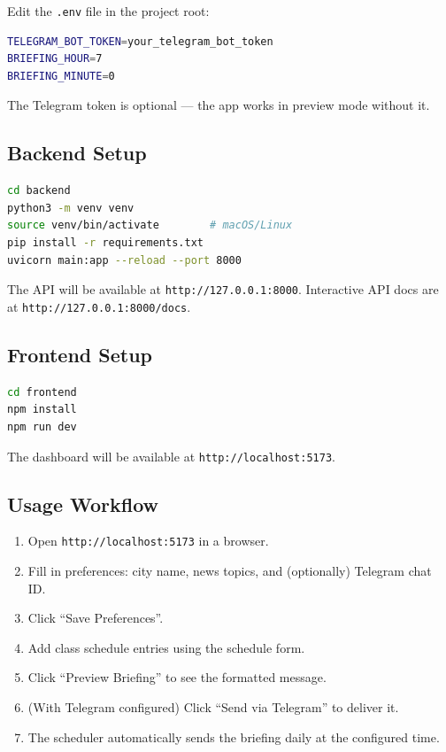 \documentclass[12pt, a4paper]{article}
\begin{document}
Edit the \texttt{.env} file in the project root:

\begin{lstlisting}[language=bash, title={.env}]
TELEGRAM_BOT_TOKEN=your_telegram_bot_token
BRIEFING_HOUR=7
BRIEFING_MINUTE=0
\end{lstlisting}

The Telegram token is optional --- the app works in preview mode without it.

\subsection{Backend Setup}

\begin{lstlisting}[language=bash, title={Backend setup commands}]
cd backend
python3 -m venv venv
source venv/bin/activate        # macOS/Linux
pip install -r requirements.txt
uvicorn main:app --reload --port 8000
\end{lstlisting}

The API will be available at \texttt{http://127.0.0.1:8000}. Interactive API docs are at \texttt{http://127.0.0.1:8000/docs}.

\subsection{Frontend Setup}

\begin{lstlisting}[language=bash, title={Frontend setup commands}]
cd frontend
npm install
npm run dev
\end{lstlisting}

The dashboard will be available at \texttt{http://localhost:5173}.

\subsection{Usage Workflow}

\begin{enumerate}[leftmargin=2em]
  \item Open \texttt{http://localhost:5173} in a browser.
  \item Fill in preferences: city name, news topics, and (optionally) Telegram chat ID.
  \item Click ``Save Preferences''.
  \item Add class schedule entries using the schedule form.
  \item Click ``Preview Briefing'' to see the formatted message.
  \item (With Telegram configured) Click ``Send via Telegram'' to deliver it.
  \item The scheduler automatically sends the briefing daily at the configured time.
\end{enumerate}
\end{document}
